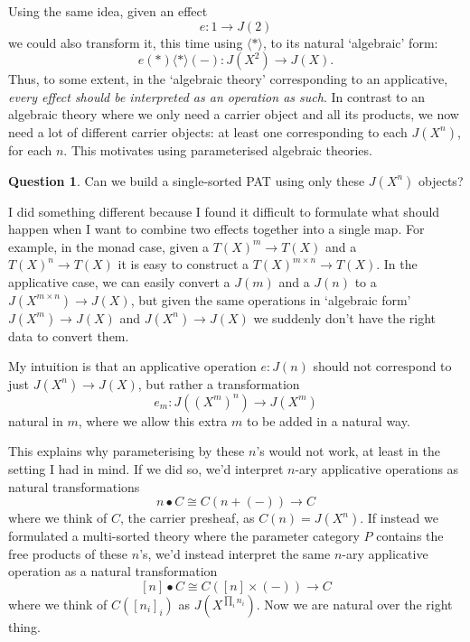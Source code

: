 \documentclass{article}
\theoremstyle{definition}
\newtheorem{question}[thm]{Question}
\theoremstyle{remark}
\newcommand{\iapp}{\mathbin{\langle * \rangle}}
\begin{document}
Using the same idea, given an effect $$e: 1 \to J(2)$$ we could also transform it, this time using $\iapp$, to its natural `algebraic' form: $$e(*) \iapp (-): J(X^2) \to J(X).$$ Thus, to some extent, in the `algebraic theory' corresponding to an applicative, \emph{every effect should be interpreted as an operation as such}. In contrast to an algebraic theory where we only need a carrier object and all its products, we now need a lot of different carrier objects: at least one corresponding to each $J(X^n)$, for each $n$. This motivates using parameterised algebraic theories.

\begin{question}
  Can we build a single-sorted PAT using only these $J(X^n)$ objects? 
\end{question}

I did something different because I found it difficult to formulate what should happen when I want to combine two effects together into a single map. For example, in the monad case, given a $T(X)^m \to T(X)$ and a $T(X)^n \to T(X)$ it is easy to construct a $T(X)^{m\times n} \to T(X)$. In the applicative case, we can easily convert a $J(m)$ and a $J(n)$ to a $J(X^{m \times n}) \to J(X)$, but given the same operations in `algebraic form' $J(X^m) \to J(X)$ and $J(X^n) \to J(X)$ we suddenly don't have the right data to convert them. 

My intuition is that an applicative operation $e: J(n)$ should not correspond to just $J(X^n) \to J(X)$, but rather a transformation $$e_m: J((X^{m})^n)\to J(X^{m})$$ natural in $m$, where we allow this extra $m$ to be added in a natural way.

This explains why parameterising by these $n$'s would not work, at least in the setting I had in mind. If we did so, we'd interpret $n$-ary applicative operations as natural transformations \[
n \bullet C \cong C(n+(-)) \to C
\]
where we think of $C$, the carrier presheaf, as $C(n) = J(X^n)$. If instead we formulated a multi-sorted theory where the parameter category $P$ contains the free products of these $n$'s, we'd instead interpret the same $n$-ary applicative operation as a natural transformation
\[
[n] \bullet C \cong C([n] \times (-)) \to C
\]
where we think of $C([n_i]_i)$ as $J(X^{\prod_i n_i})$. Now we are natural over the right thing. 


\end{document}
